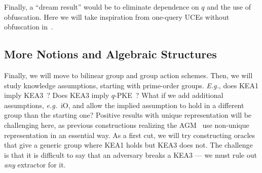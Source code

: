 Finally, a ``dream result'' would be to eliminate dependence on $q$ and the use of obfuscation. Here we will take inspiration from one-query UCEs without obfuscation in~\cite{C:Zhandry16,EPRINT:CheMao24}. 

\subsection{More Notions and  Algebraic Structures} \label{sec-more}

Finally, we will move to  bilinear group and group action schemes.  Then, we will  study knowledge assumptions, starting with prime-order groups. \emph{E.g.}, does KEA1 imply KEA3~\cite{C:Damgaard91,C:BelPal04}? Does KEA3 imply $q$-PKE~\cite{AC:Groth10a}? What if we add additional assumptions, \emph{e.g.}~iO, and allow the implied assumption to hold in a different group than the starting one? Positive results with unique representation will be challenging here, as previous constructions realizing the AGM~\cite{EC:AgrHofKas20}  use non-unique representation in an essential way. As a first cut, we will try constructing  oracles that give a generic group where KEA1 holds but KEA3  does not. 
The challenge is that it is difficult to say that an adversary breaks a KEA3 --- we must rule out \emph{any} extractor for it. 

%    

